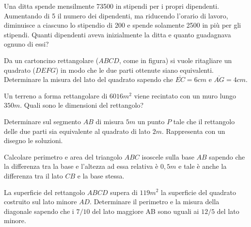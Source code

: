 \begin{multicols}{2}
\begin{esercizio}[\Ast]
 \label{ese:3.134}
Una ditta spende mensilmente 73500 in stipendi per i propri dipendenti.
Aumentando di 5 il numero dei dipendenti, ma riducendo l'orario di lavoro,
diminuisce a ciascuno lo stipendio di 200 e spende solamente 2500 in più per
gli stipendi. Quanti dipendenti aveva inizialmente la ditta e quanto
guadagnava ognuno di essi?
\end{esercizio}

\begin{esercizio}[\Ast]
 \label{ese:3.135}
Da un cartoncino rettangolare ($ ABCD $, come in figura) si vuole ritagliare un
quadrato ($ DEFG $) in modo che le due parti ottenute siano equivalenti.
Determinare la misura del lato del quadrato sapendo che
$\overline {EC} = 6\unit{cm} $ e $\overline {AG} = 4\unit{cm}$.
\begin{center}
 
\end{center}
\end{esercizio}

\begin{esercizio}[\Ast]
 \label{ese:3.136}
Un terreno a forma rettangolare di $6016\unit{m^2}$ viene recintato con un muro lungo
$350\unit{m}$. Quali sono le dimensioni del rettangolo?
\end{esercizio}

\begin{esercizio}[\Ast]
 \label{ese:3.137}
Determinare sul segmento $ AB $ di misura $ 5\unit{m} $ un punto $ P $ tale che il rettangolo
delle due parti sia equivalente al quadrato di lato $ 2\unit{m} $. Rappresenta con un
disegno le soluzioni.
\end{esercizio}

\begin{esercizio}[\Ast]
 \label{ese:3.138}
Calcolare perimetro e area del triangolo $ ABC $ isoscele sulla base $ AB $ sapendo
che la differenza tra la base e l’altezza ad essa relativa è $ 0,5\unit{m} $ e tale
è anche la differenza tra il lato $ CB $ e la base stessa.
\end{esercizio}

\begin{esercizio}[\Ast]
 \label{ese:3.139}
La superficie del rettangolo $ ABCD $ supera di $ 119\unit{m^2} $ la superficie del quadrato
costruito sul lato minore $ AD $. Determinare il perimetro e la misura della
diagonale sapendo che i $ 7/10 $ del lato maggiore AB sono uguali ai $ 12/5 $ del
lato minore.
\end{esercizio}


\end{multicols}
